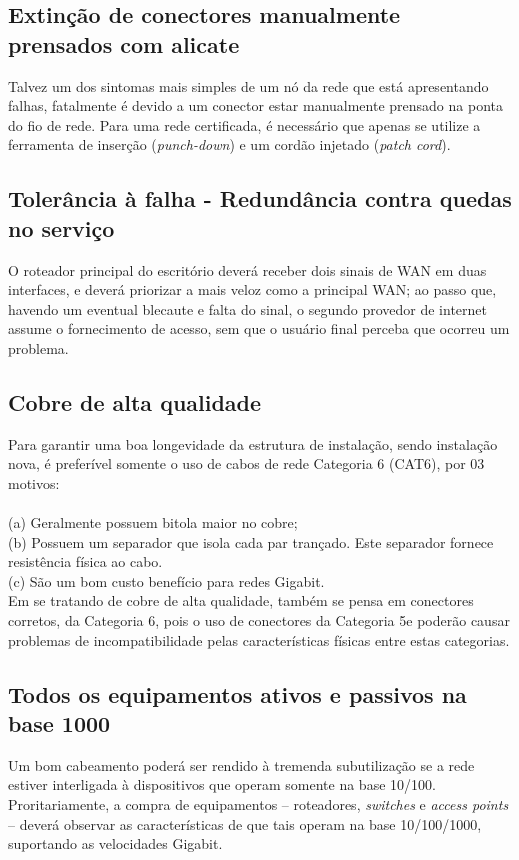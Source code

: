 \documentclass[	DIV=calc,%
							paper=a4,%
							fontsize=12pt,%
							onecolumn]{scrartcl}	 					%
\begin{document}
\subsection{Extinção de conectores manualmente prensados com alicate}
Talvez um dos sintomas mais simples de um nó da rede que está apresentando falhas, fatalmente é devido a um conector estar manualmente prensado na ponta do fio de rede. Para uma rede certificada, é necessário que apenas se utilize a ferramenta de inserção (\textit{punch-down}) e um cordão injetado (\textit{patch cord}).

\subsection{Tolerância à falha - Redundância contra quedas no serviço}
O roteador principal do escritório deverá receber dois sinais de WAN em duas interfaces, e deverá priorizar a mais veloz como a principal WAN; ao passo que, havendo um eventual blecaute e falta do sinal, o segundo provedor de internet assume o fornecimento de acesso, sem que o usuário final perceba que ocorreu um problema.

\subsection{Cobre de alta qualidade}
Para garantir uma boa longevidade da estrutura de instalação, sendo instalação nova, é preferível somente o uso de cabos de rede Categoria 6 (CAT6), por 03 motivos: \\ \\
(a) Geralmente possuem bitola maior no cobre;\\
(b) Possuem um separador que isola cada par trançado. Este separador fornece resistência física ao cabo.\\
(c) São um bom custo benefício para redes Gigabit.\\

Em se tratando de cobre de alta qualidade, também se pensa em conectores corretos, da Categoria 6, pois o uso de conectores da Categoria 5e poderão causar problemas de incompatibilidade pelas características físicas entre estas categorias.

\subsection{Todos os equipamentos ativos e passivos na base 1000}
Um bom cabeamento poderá ser rendido à tremenda subutilização se a rede estiver interligada à dispositivos que operam somente na base 10/100. Proritariamente, a compra de equipamentos -- roteadores, \textit{switches} e \textit{access points} -- deverá observar as características de que tais operam na base 10/100/1000, suportando as velocidades Gigabit.
\end{document}
